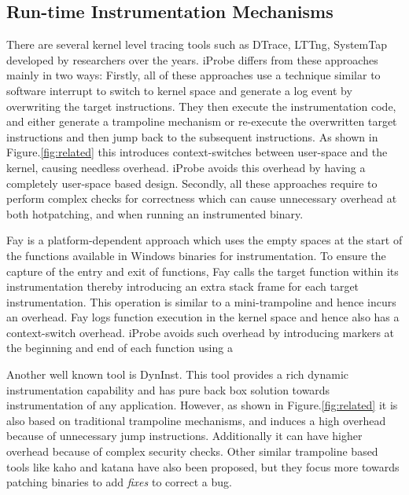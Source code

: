 \subsection{Run-time Instrumentation Mechanisms}
There are several kernel level tracing tools such as DTrace, LTTng, SystemTap \cite{dtrace,lttng,systemtap} developed by researchers over the years.
iProbe differs from these approaches mainly in two ways: Firstly, all of these approaches use a technique similar to software interrupt to switch to kernel space and generate a log event by overwriting the target instructions. 
They then execute the instrumentation code, and either generate a trampoline mechanism or re-execute the overwritten target instructions and then jump back to the subsequent instructions. 
As shown in Figure.\ref{fig:related} this introduces context-switches between user-space and the kernel, causing needless overhead. 
iProbe avoids this overhead by having a completely user-space based design.
Secondly, all these approaches require to perform complex checks for correctness which can cause unnecessary overhead at both hotpatching, and when running an instrumented binary. 

Fay \cite{fay} is a platform-dependent approach which uses the empty spaces at the start of the functions available in Windows binaries for instrumentation. 
To ensure the capture of the entry and exit of functions, Fay calls the target function within its instrumentation thereby introducing an extra stack frame for each target instrumentation. 
This operation is similar to a mini-trampoline and hence incurs an overhead. 
Fay logs function execution in the kernel space and hence also has a context-switch overhead.
iProbe avoids such overhead by introducing markers at the beginning and end of
each function using a 

Another well known tool is DynInst\cite{dyninst}. This tool provides a rich dynamic instrumentation capability and has pure back box solution towards instrumentation of any application.
However, as shown in Figure.\ref{fig:related} it is also based on traditional trampoline mechanisms, and induces a high overhead because of unnecessary jump instructions.
Additionally it can have higher overhead because of complex security checks. 
Other similar trampoline based tools like kaho and katana\cite{katana,kaho} have also been proposed, but they focus more towards patching binaries to add \emph{fixes} to correct a bug.

